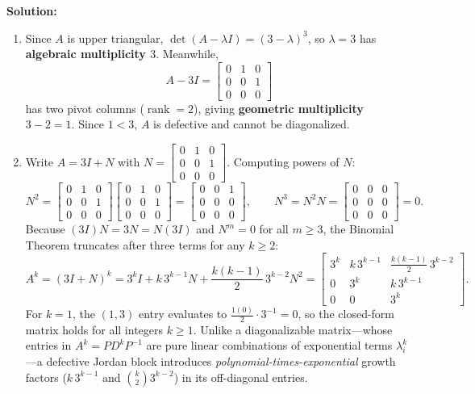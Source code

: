 \documentclass[11pt, letterpaper]{article}
\theoremstyle{definition}
\theoremstyle{remark}
\begin{document}
\textbf{Solution:}
\begin{enumerate}[label=(\alph*)]
    \item Since $A$ is upper triangular, $\det(A - \lambda I) = (3 - \lambda)^{3}$, so $\lambda = 3$ has \textbf{algebraic multiplicity $3$}. Meanwhile,
    \[
    A - 3I = \begin{bmatrix} 0 & 1 & 0 \\ 0 & 0 & 1 \\ 0 & 0 & 0 \end{bmatrix}
    \]
    has two pivot columns ($\operatorname{rank} = 2$), giving \textbf{geometric multiplicity} $3 - 2 = 1$. Since $1 < 3$, $A$ is defective and cannot be diagonalized.

    \item Write $A = 3I + N$ with $N = \begin{bmatrix} 0 & 1 & 0 \\ 0 & 0 & 1 \\ 0 & 0 & 0 \end{bmatrix}$. Computing powers of $N$:
    \[
    N^{2} = \begin{bmatrix} 0 & 1 & 0 \\ 0 & 0 & 1 \\ 0 & 0 & 0 \end{bmatrix}\begin{bmatrix} 0 & 1 & 0 \\ 0 & 0 & 1 \\ 0 & 0 & 0 \end{bmatrix} = \begin{bmatrix} 0 & 0 & 1 \\ 0 & 0 & 0 \\ 0 & 0 & 0 \end{bmatrix}, \qquad N^{3} = N^{2}N = \begin{bmatrix} 0 & 0 & 0 \\ 0 & 0 & 0 \\ 0 & 0 & 0 \end{bmatrix} = 0.
    \]
    Because $(3I)N = 3N = N(3I)$ and $N^{m} = 0$ for all $m \ge 3$, the Binomial Theorem truncates after three terms for any $k \ge 2$:
    \[
    A^{k} = (3I + N)^{k} = 3^{k}I + k\,3^{k-1}N + \frac{k(k-1)}{2}\,3^{k-2}N^{2} = \begin{bmatrix} 3^{k} & k\,3^{k-1} & \frac{k(k-1)}{2}\,3^{k-2} \\ 0 & 3^{k} & k\,3^{k-1} \\ 0 & 0 & 3^{k} \end{bmatrix}.
    \]
    For $k = 1$, the $(1,3)$ entry evaluates to $\frac{1(0)}{2}\cdot 3^{-1} = 0$, so the closed-form matrix holds for all integers $k \ge 1$. Unlike a diagonalizable matrix—whose entries in $A^{k} = PD^{k}P^{-1}$ are pure linear combinations of exponential terms $\lambda_{i}^{k}$—a defective Jordan block introduces \emph{polynomial-times-exponential} growth factors ($k\,3^{k-1}$ and $\binom{k}{2}3^{k-2}$) in its off-diagonal entries.
\end{enumerate}
\end{document}
